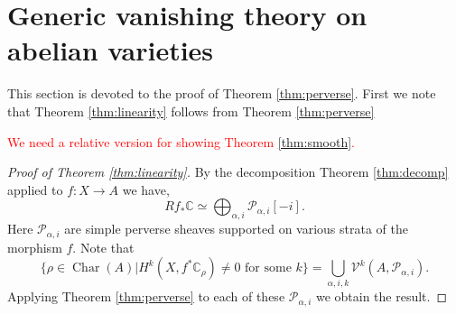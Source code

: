 \documentclass[12pt,reqno]{amsart}
\theoremstyle{question}
\theoremstyle{definition}
\theoremstyle{remark}
\theoremstyle{cited}
\theoremstyle{citeddef}
\DeclareMathOperator{\Char}{Char}
\newcommand{\sP}{\mathcal{P}}
\newcommand\sV{{\mathcal V}}
\newcommand{\bbC}{\mathbb{C}}
\newcommand{\sorry}[1]{\textcolor{red}{#1}}
\begin{document}
\section{Generic vanishing theory on abelian varieties}
This section is devoted to the proof of Theorem \ref{thm:perverse}. First we note that Theorem \ref{thm:linearity} follows
from Theorem \ref{thm:perverse}

\sorry{We need a relative version for showing Theorem \ref{thm:smooth}.}

\begin{proof}[Proof of Theorem \ref{thm:linearity}]
By the decomposition Theorem \ref{thm:decomp} applied to $f\colon X\to A$
we have, 
\[Rf_*\bbC\simeq \bigoplus_{\alpha,i} \sP_{\alpha,i}[-i].\]
Here $\sP_{\alpha, i}$ are simple perverse sheaves supported on various strata of the morphism $f$. 
Note that
\[\{\rho\in \Char(A)| H^k(X, f^*\bbC_{\rho})\neq 0 \text{ for some } k\} = \bigcup_{\alpha, i, k}\sV^k(A, \sP_{\alpha, i}).\]
Applying Theorem \ref{thm:perverse} to each 
of these $\sP_{\alpha,i}$ we obtain the result.
\end{proof}
\end{document}
